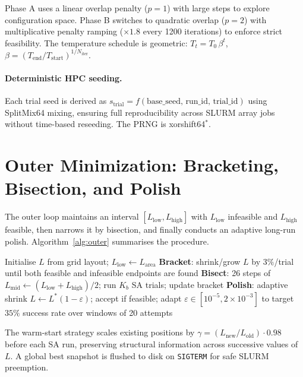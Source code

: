 \documentclass[10pt,twocolumn]{article}
\begin{document}
Phase A uses a linear overlap penalty ($p=1$) with large steps to explore
configuration space.  Phase B switches to quadratic overlap ($p=2$) with
multiplicative penalty ramping ($\times 1.8$ every 1200 iterations) to
enforce strict feasibility.  The temperature schedule is geometric:
$T_t = T_0\,\beta^t$, $\beta = (T_{\mathrm{end}}/T_{\mathrm{start}})^{1/N_{\mathrm{iter}}}$.

\paragraph{Deterministic HPC seeding.}
Each trial seed is derived as
$s_{\mathrm{trial}} = f(\text{base\_seed},\,\text{run\_id},\,\text{trial\_id})$
using SplitMix64 mixing, ensuring full reproducibility across SLURM array jobs
without time-based reseeding.  The PRNG is xorshift64$^*$.

\section{Outer Minimization: Bracketing, Bisection, and Polish}
\label{sec:outer}

The outer loop maintains an interval $[L_{\mathrm{low}}, L_{\mathrm{high}}]$
with $L_{\mathrm{low}}$ infeasible and $L_{\mathrm{high}}$ feasible,
then narrows it by bisection, and finally conducts an adaptive long-run polish.
Algorithm~\ref{alg:outer} summarises the procedure.

\begin{algorithm}[H]
\caption{Outer minimisation}
\label{alg:outer}
\begin{algorithmic}[1]
\State Initialise $L$ from grid layout; $L_{\mathrm{low}}\leftarrow L_{\mathrm{area}}$
\State \textbf{Bracket}: shrink/grow $L$ by $3\%$/trial until both
       feasible and infeasible endpoints are found
\State \textbf{Bisect}: 26 steps of $L_{\mathrm{mid}}\leftarrow(L_{\mathrm{low}}+L_{\mathrm{high}})/2$;
       run $K_b$ SA trials; update bracket
\State \textbf{Polish}: adaptive shrink $L\leftarrow L^*(1-\varepsilon)$;
       accept if feasible; adapt $\varepsilon\in[10^{-5},2\!\times\!10^{-3}]$
       to target $35\%$ success rate over windows of 20 attempts
\end{algorithmic}
\end{algorithm}

The warm-start strategy scales existing positions by
$\gamma = (L_{\mathrm{new}}/L_{\mathrm{old}})\cdot 0.98$ before each SA
run, preserving structural information across successive values of $L$.
A global best snapshot is flushed to disk on \texttt{SIGTERM} for safe
SLURM preemption.
\end{document}
